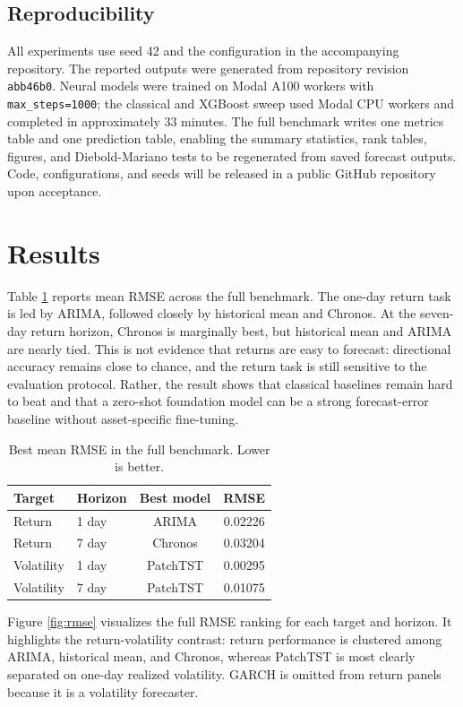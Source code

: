 \documentclass[10pt]{article}
\begin{document}
\subsection{Reproducibility}
All experiments use seed 42 and the configuration in the accompanying
repository. The reported outputs were generated from repository revision
\texttt{abb46b0}. Neural models were trained on Modal A100 workers with
\texttt{max\_steps=1000}; the classical and XGBoost sweep used Modal CPU
workers and completed in approximately 33 minutes. The full benchmark writes
one metrics table and one prediction table, enabling the summary statistics,
rank tables, figures, and Diebold-Mariano tests to be regenerated from saved
forecast outputs. Code, configurations, and seeds will be released in a public
GitHub repository upon acceptance.

\section{Results}
Table \ref{tab:rmse} reports mean RMSE across the full benchmark. The one-day
return task is led by ARIMA, followed closely by historical mean and Chronos.
At the seven-day return horizon, Chronos is marginally best, but historical
mean and ARIMA are nearly tied. This is not evidence that returns are easy to
forecast: directional accuracy remains close to chance, and the return task is
still sensitive to the evaluation protocol. Rather, the result shows that
classical baselines remain hard to beat and that a zero-shot foundation model
can be a strong forecast-error baseline without asset-specific fine-tuning.

\begin{table}[t]
\caption{Best mean RMSE in the full benchmark. Lower is better.}
\label{tab:rmse}
\begin{center}
\begin{tabular}{llcc}
\toprule
Target & Horizon & Best model & RMSE \\
\midrule
Return & 1 day & ARIMA & 0.02226 \\
Return & 7 day & Chronos & 0.03204 \\
Volatility & 1 day & PatchTST & 0.00295 \\
Volatility & 7 day & PatchTST & 0.01075 \\
\bottomrule
\end{tabular}
\end{center}
\end{table}

Figure \ref{fig:rmse} visualizes the full RMSE ranking for each target and
horizon. It highlights the return-volatility contrast: return performance is
clustered among ARIMA, historical mean, and Chronos, whereas PatchTST is most
clearly separated on one-day realized volatility. GARCH is omitted from return
panels because it is a volatility forecaster.
\end{document}
